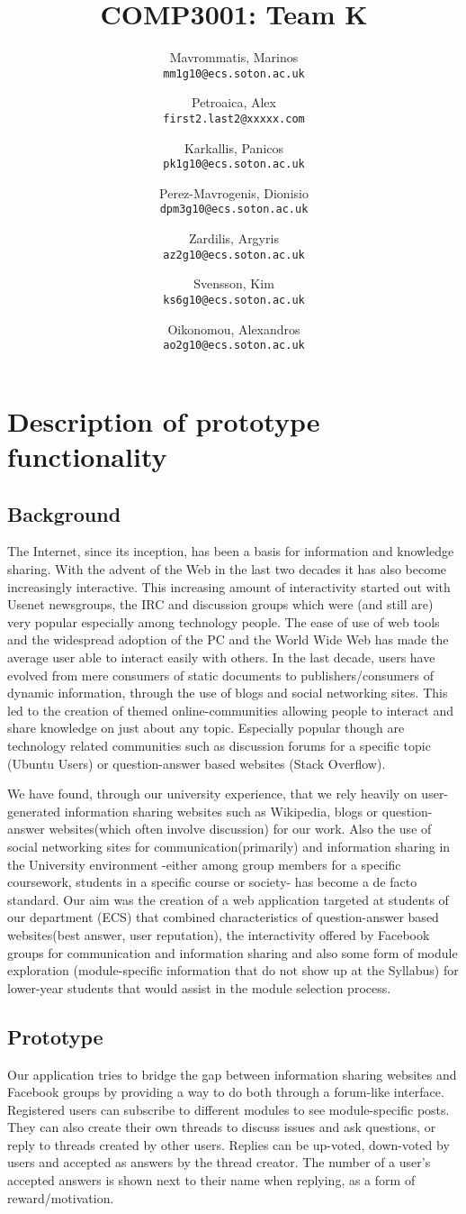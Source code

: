 \documentclass[12pt,a4paper,titlepage]{article}
\author{
  Mavrommatis, Marinos\\ 
\texttt{mm1g10@ecs.soton.ac.uk}
\and
Petroaica, Alex\\ 
\texttt{first2.last2@xxxxx.com}
\and
Karkallis, Panicos\\ 
\texttt{pk1g10@ecs.soton.ac.uk}
\and
Perez-Mavrogenis, Dionisio\\
 \texttt{dpm3g10@ecs.soton.ac.uk}
\and
Zardilis, Argyris\\
 \texttt{az2g10@ecs.soton.ac.uk}
\and
Svensson, Kim\\
 \texttt{ks6g10@ecs.soton.ac.uk}
\and
Oikonomou, Alexandros\\
 \texttt{ao2g10@ecs.soton.ac.uk}
}
\title{COMP3001: Team K}
\begin{document}
\maketitle

\section{Description of prototype functionality}
\subsection{Background}
The Internet, since its inception, has been a basis for information and knowledge sharing. With the advent of the Web in the last two decades it has also become increasingly interactive. This increasing amount of interactivity started out with Usenet newsgroups, the IRC and discussion groups which were (and still are) very popular especially among technology people. The ease of use of web tools and the widespread adoption of the PC and the World Wide Web has made the average user able to interact easily with others. In the last decade, users have evolved from mere consumers of static documents to publishers/consumers of dynamic information, through the use of blogs and social networking sites. This led to the creation of themed online-communities allowing people to interact and share knowledge on just about any topic. Especially popular though are technology related communities such as discussion forums for a specific topic (Ubuntu Users) or question-answer based websites (Stack Overflow).

We have found, through our university experience, that we rely heavily on user-generated information sharing websites such as Wikipedia, blogs or question-answer websites(which often involve discussion) for our work. Also the use of social networking sites for communication(primarily) and information sharing in the University environment -either among group members for a specific coursework, students in a specific course or society- has become a de facto standard. Our aim was the creation of a web application targeted at students of our department (ECS) that combined characteristics of question-answer based websites(best answer, user reputation), the interactivity offered by Facebook groups for communication and information sharing and also some form of module exploration (module-specific information that do not show up at the Syllabus) for lower-year students that would assist in the module selection process.
\subsection{Prototype}
Our application tries to bridge the gap between information sharing websites and Facebook groups by providing a way to do both through a forum-like interface.  Registered users can subscribe to different modules to see module-specific posts. They can also create their own threads to discuss issues and ask questions, or reply to threads created by other users. Replies can be up-voted, down-voted by users and accepted as answers by the thread creator. The number of a user's accepted answers is shown next to their name when replying, as a form of reward/motivation.
\end{document}
